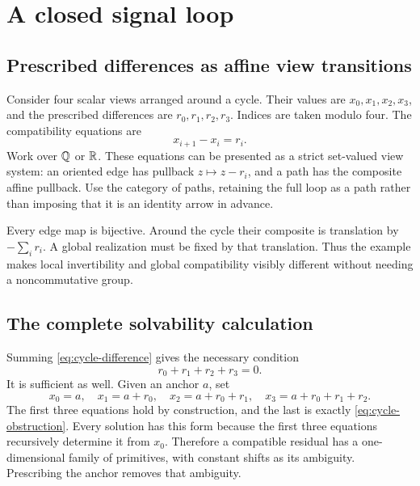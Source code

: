 \section{A closed signal loop}\label{sec:signal-loop}
\subsection{Prescribed differences as affine view transitions}
Consider four scalar views arranged around a cycle. Their values are \(x_0,x_1,x_2,x_3\), and the prescribed differences are \(r_0,r_1,r_2,r_3\). Indices are taken modulo four. The compatibility equations are
\begin{equation}\label{eq:cycle-difference}
 x_{i+1}-x_i=r_i.
\end{equation}
Work over \(\mathbb Q\) or \(\mathbb R\). These equations can be presented as a strict set-valued view system: an oriented edge has pullback \(z\mapsto z-r_i\), and a path has the composite affine pullback. Use the category of paths, retaining the full loop as a path rather than imposing that it is an identity arrow in advance.

Every edge map is bijective. Around the cycle their composite is translation by \(-\sum_i r_i\). A global realization must be fixed by that translation. Thus the example makes local invertibility and global compatibility visibly different without needing a noncommutative group.

\subsection{The complete solvability calculation}
Summing \eqref{eq:cycle-difference} gives the necessary condition
\begin{equation}\label{eq:cycle-obstruction}
 r_0+r_1+r_2+r_3=0.
\end{equation}
It is sufficient as well. Given an anchor \(a\), set
\[
 x_0=a,\quad x_1=a+r_0,\quad
 x_2=a+r_0+r_1,\quad x_3=a+r_0+r_1+r_2.
\]
The first three equations hold by construction, and the last is exactly \eqref{eq:cycle-obstruction}. Every solution has this form because the first three equations recursively determine it from \(x_0\). Therefore a compatible residual has a one-dimensional family of primitives, with constant shifts as its ambiguity. Prescribing the anchor removes that ambiguity.

